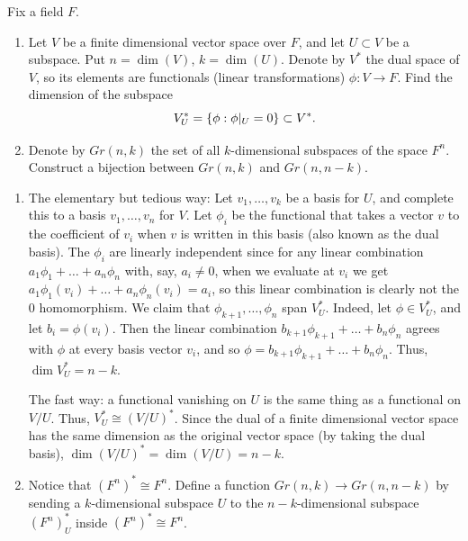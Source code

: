 %
\begin{question}[subtitle = August 2025 Problem 4,ID=Aug25_4]
Fix a field $F$.
\begin{enumerate}
    \item Let $V$ be a finite dimensional vector space over $F$, and let $U \subset V$ be a subspace. Put $n = \dim(V)$, $k = \dim(U)$. Denote by $V^*$ the dual space of $V$, so its elements are functionals (linear transformations) $\phi\colon V \to F$. Find the dimension of the subspace
    \[V_U^* = \{\phi: \phi\vert_U = 0\} \subset V^*.\]
    \item Denote by $Gr(n,k)$ the set of all $k$-dimensional subspaces of the space $F^n$. Construct a bijection between $Gr(n,k)$ and $Gr(n,n-k)$.
\end{enumerate}
\end{question}
\begin{solution}
\begin{enumerate}
    \item The elementary but tedious way: Let $v_1,\dots,v_k$ be a basis for $U$, and complete this to a basis $v_1,\dots,v_n$ for $V$. Let $\phi_i$ be the functional that takes a vector $v$ to the coefficient of $v_i$ when $v$ is written in this basis (also known as the dual basis). The $\phi_i$ are linearly independent since for any linear combination $a_1 \phi_1 + \dots + a_n \phi_n$ with, say, $a_i \neq 0$, when we evaluate at $v_i$ we get $a_1 \phi_1(v_i) + \dots + a_n \phi_n(v_i) = a_i$, so this linear combination is clearly not the 0 homomorphism. We claim that $\phi_{k+1},\dots,\phi_n$ span $V_U^*$. Indeed, let $\phi \in V_U^*$, and let $b_i = \phi(v_i)$. Then the linear combination $b_{k+1} \phi_{k+1} + \dots + b_n \phi_n$ agrees with $\phi$ at every basis vector $v_i$, and so $\phi = b_{k+1} \phi_{k+1} + \dots + b_n \phi_n$. Thus, $\dim V_U^* = n-k$.

    The fast way: a functional vanishing on $U$ is the same thing as a functional on $V/U$. Thus, $V_U^* \cong (V/U)^*$. Since the dual of a finite dimensional vector space has the same dimension as the original vector space (by taking the dual basis), $\dim(V/U)^* = \dim (V/U) = n - k$.
    \item Notice that $(F^n)^* \cong F^n$. Define a function $Gr(n,k) \to Gr(n,n-k)$ by sending a $k$-dimensional subspace $U$ to the $n-k$-dimensional subspace $(F^n)_U^*$ inside $(F^n)^* \cong F^n$.
\end{enumerate}
\end{solution}

